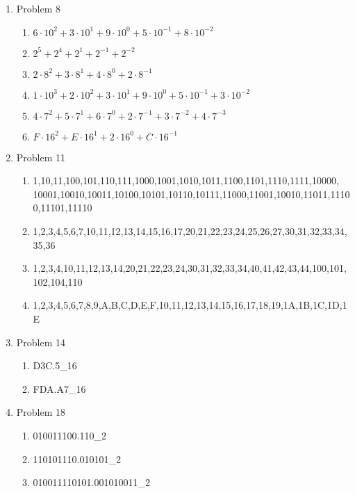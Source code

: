 \begin{enumerate}[leftmargin=2cm,labelsep=.5cm,label=\bf\arabic*.]

\item Problem 8
\begin{enumerate}
  \item $6 \cdot 10^2 + 3 \cdot 10^1 + 9 \cdot 10^0 + 5 \cdot 10^{-1} + 8 \cdot 10^{-2}$
  \item $2^5 + 2^4 + 2^1 + 2^{-1} + 2^{-2}$
  \item $2 \cdot 8^2 + 3 \cdot 8^1 + 4 \cdot 8^0 + 2 \cdot 8^{-1}$
  \item $1 \cdot 10^3 + 2 \cdot 10^2 + 3 \cdot 10^1 + 9 \cdot 10^0 + 5 \cdot 10^{-1} + 3 \cdot 10^{-2}$
  \item $4 \cdot 7^2 + 5 \cdot 7^1 + 6 \cdot 7^0 + 2 \cdot 7^{-1} + 3 \cdot 7^{-2} + 4 \cdot 7^{-3}$
  \item $F \cdot 16^2 + E \cdot 16^1 + 2 \cdot 16^0 + C \cdot 16^{-1}$
\end{enumerate}

\item Problem 11
\begin{enumerate}
  \item 1,10,11,100,101,110,111,1000,1001,1010,1011,1100,1101,1110,1111,10000,\\
  10001,10010,10011,10100,10101,10110,10111,11000,11001,10010,11011,11100,11101,11110
  \item 1,2,3,4,5,6,7,10,11,12,13,14,15,16,17,20,21,22,23,24,25,26,27,30,31,32,33,34,35,36
  \item 1,2,3,4,10,11,12,13,14,20,21,22,23,24,30,31,32,33,34,40,41,42,43,44,100,101,102,104,110
  \item 1,2,3,4,5,6,7,8,9,A,B,C,D,E,F,10,11,12,13,14,15,16,17,18,19,1A,1B,1C,1D,1E
\end{enumerate}

\item Problem 14
\begin{enumerate}
  \item D3C.5_{16}
  \item FDA.A7_{16}
\end{enumerate}

\item Problem 18
\begin{enumerate}
  \item 010011100.110_2
  \item 110101110.010101_2
  \item 010011110101.001010011_2
\end{enumerate}


\end{enumerate}
